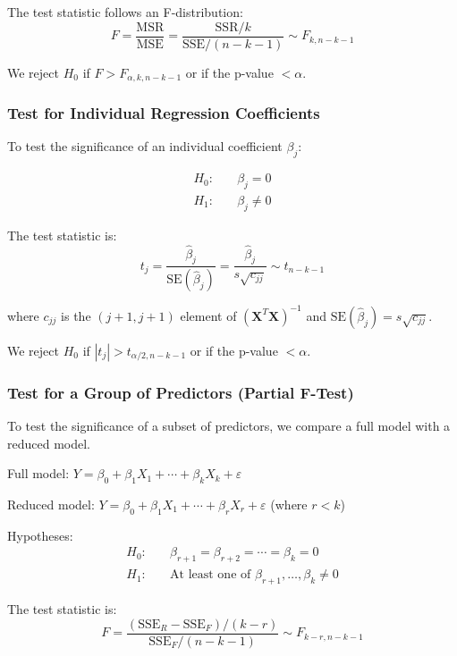 \documentclass[twoside]{book}
\begin{document}
The test statistic follows an F-distribution:
\begin{equation}
F = \frac{\text{MSR}}{\text{MSE}} = \frac{\text{SSR}/k}{\text{SSE}/(n-k-1)} \sim F_{k, n-k-1}
\end{equation}

We reject $H_0$ if $F > F_{\alpha, k, n-k-1}$ or if the p-value $< \alpha$.

\subsubsection{Test for Individual Regression Coefficients}

To test the significance of an individual coefficient $\beta_j$:

\begin{align}
H_0: &\quad \beta_j = 0 \\
H_1: &\quad \beta_j \neq 0
\end{align}

The test statistic is:
\begin{equation}
t_j = \frac{\hat{\beta}_j}{\text{SE}(\hat{\beta}_j)} = \frac{\hat{\beta}_j}{s\sqrt{c_{jj}}} \sim t_{n-k-1}
\end{equation}

where $c_{jj}$ is the $(j+1, j+1)$ element of $(\mathbf{X}^T\mathbf{X})^{-1}$ and $\text{SE}(\hat{\beta}_j) = s\sqrt{c_{jj}}$.

We reject $H_0$ if $|t_j| > t_{\alpha/2, n-k-1}$ or if the p-value $< \alpha$.

\subsubsection{Test for a Group of Predictors (Partial F-Test)}

To test the significance of a subset of predictors, we compare a full model with a reduced model.

Full model: $Y = \beta_0 + \beta_1 X_1 + \cdots + \beta_k X_k + \varepsilon$

Reduced model: $Y = \beta_0 + \beta_1 X_1 + \cdots + \beta_r X_r + \varepsilon$ (where $r < k$)

Hypotheses:
\begin{align}
H_0: &\quad \beta_{r+1} = \beta_{r+2} = \cdots = \beta_k = 0 \\
H_1: &\quad \text{At least one of } \beta_{r+1}, \ldots, \beta_k \neq 0
\end{align}

The test statistic is:
\begin{equation}
F = \frac{(\text{SSE}_R - \text{SSE}_F)/(k-r)}{\text{SSE}_F/(n-k-1)} \sim F_{k-r, n-k-1}
\end{equation}
\end{document}
